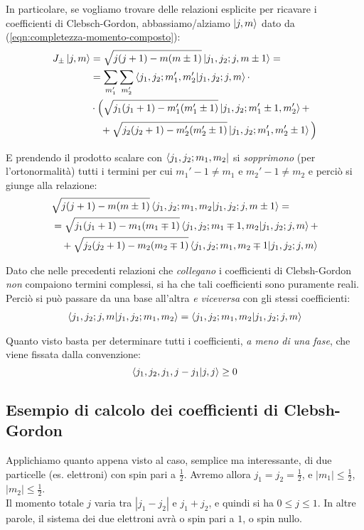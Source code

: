 \documentclass[../../FisicaTeorica.tex]{subfiles}
\begin{document}
In particolare, se vogliamo trovare delle relazioni esplicite per ricavare i coefficienti di Clebsch-Gordon, abbassiamo/alziamo $\ket{j,m}$ dato da (\ref{eqn:completezza-momento-composto}):
\begin{align*}
J_{\pm}\ket{j,m}&=\sqrt{j(j+1)-m(m\pm1)}\ket{j_1, j_2; j, m\pm 1} =\\
&=\sum_{m_1'}\sum_{m_2'} \braket{j_1, j_2;m_1',m_2'|j_1, j_2; j,m}\cdot\\
&\cdot \Big ( \sqrt{j_1(j_1+1)-m_1'(m_1'\pm1)}\ket{j_1, j_2; m_1' \pm1, m_2'} +\\
&\quad +\sqrt{j_2(j_2+1)-m_2'(m_2'\pm1)}\ket{j_1, j_2; m_1', m_2' \pm1}\Big)
\end{align*}

E prendendo il prodotto scalare con $\bra{j_1, j_2; m_1, m_2}$ si \textit{sopprimono} (per l'ortonormalità) tutti i termini per cui $m_1'-1 \neq m_1$ e $m_2'-1\neq m_2$ e perciò si giunge alla relazione:
\begin{align}\nonumber
&\sqrt{j(j+1)-m(m\pm1)}\braket{j_1, j_2; m_1, m_2|j_1, j_2; j, m \pm1} =\\ \nonumber
&= \sqrt{j_1(j_1+1)-m_1(m_1\mp1)}\braket{j_1, j_2; m_1 \mp 1, m_2|j_1, j_2; j, m} +\\
&\quad+\sqrt{j_2(j_2+1)-m_2(m_2\mp1)}\braket{j_1, j_2; m_1, m_2\mp1|j_1, j_2; j,m}
\label{eqn:recursione-coefficienti}
\end{align}

Dato che nelle precedenti relazioni che \textit{collegano} i coefficienti di Clebsh-Gordon \textit{non} compaiono termini complessi, si ha che tali coefficienti sono puramente reali. Perciò si può passare da una base all'altra \textit{e viceversa} con gli stessi coefficienti:
\begin{align*}
\braket{j_1, j_2; j,m | j_1, j_2; m_1, m_2} = \braket{j_1, j_2; m_1, m_2| j_1, j_2; j, m}
\end{align*}

Quanto visto basta per determinare tutti i coefficienti, \textit{a meno di una fase}, che viene fissata dalla convenzione:
\[
\braket{j_1, j_2, j_1, j-j_1 | j ,j} \geq 0
\]

\subsection{Esempio di calcolo dei coefficienti di Clebsh-Gordon}
Applichiamo quanto appena visto al caso, semplice ma interessante, di due particelle (es. elettroni) con spin pari a $\frac{1}{2}$. Avremo allora $j_1 = j_2 = \frac{1}{2}$, e $|m_1|\leq \frac{1}{2}$, $|m_2|\leq \frac{1}{2}$.\\
Il momento totale $j$ varia tra $|j_1-j_2|$ e $j_1+j_2$, e quindi si ha $0\leq j \leq 1$. In altre parole, il sistema dei due elettroni avrà o spin pari a $1$, o spin nullo.\\
\end{document}
